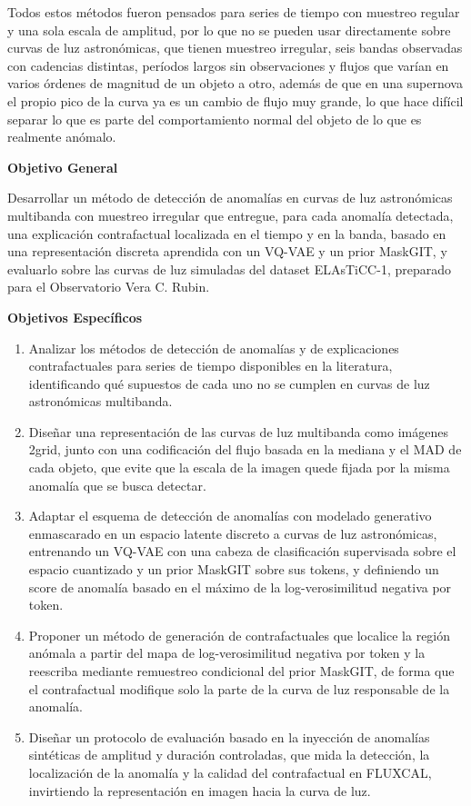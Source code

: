 \documentclass[11pt]{article}
\newcommand{\seccion}[1]{\vspace{6pt}\noindent{\large\textbf{$\bullet$ #1}}\par\vspace{2pt}}
\begin{document}
Todos estos métodos fueron pensados para series de tiempo con muestreo regular y una sola escala de amplitud, por lo que no se pueden usar directamente sobre curvas de luz astronómicas, que tienen muestreo irregular, seis bandas observadas con cadencias distintas, períodos largos sin observaciones y flujos que varían en varios órdenes de magnitud de un objeto a otro, además de que en una supernova el propio pico de la curva ya es un cambio de flujo muy grande, lo que hace difícil separar lo que es parte del comportamiento normal del objeto de lo que es realmente anómalo.

\seccion{Objetivos}

\textbf{Objetivo General}

Desarrollar un método de detección de anomalías en curvas de luz astronómicas multibanda con muestreo irregular que entregue, para cada anomalía detectada, una explicación contrafactual localizada en el tiempo y en la banda, basado en una representación discreta aprendida con un VQ-VAE y un prior MaskGIT, y evaluarlo sobre las curvas de luz simuladas del dataset ELAsTiCC-1, preparado para el Observatorio Vera C. Rubin.

\textbf{Objetivos Específicos}

\begin{enumerate}
    \item Analizar los métodos de detección de anomalías y de explicaciones contrafactuales para series de tiempo disponibles en la literatura, identificando qué supuestos de cada uno no se cumplen en curvas de luz astronómicas multibanda.
    \item Diseñar una representación de las curvas de luz multibanda como imágenes 2grid, junto con una codificación del flujo basada en la mediana y el MAD de cada objeto, que evite que la escala de la imagen quede fijada por la misma anomalía que se busca detectar.
    \item Adaptar el esquema de detección de anomalías con modelado generativo enmascarado en un espacio latente discreto a curvas de luz astronómicas, entrenando un VQ-VAE con una cabeza de clasificación supervisada sobre el espacio cuantizado y un prior MaskGIT sobre sus tokens, y definiendo un score de anomalía basado en el máximo de la log-verosimilitud negativa por token.
    \item Proponer un método de generación de contrafactuales que localice la región anómala a partir del mapa de log-verosimilitud negativa por token y la reescriba mediante remuestreo condicional del prior MaskGIT, de forma que el contrafactual modifique solo la parte de la curva de luz responsable de la anomalía.
    \item Diseñar un protocolo de evaluación basado en la inyección de anomalías sintéticas de amplitud y duración controladas, que mida la detección, la localización de la anomalía y la calidad del contrafactual en FLUXCAL, invirtiendo la representación en imagen hacia la curva de luz.
\end{enumerate}
\end{document}
